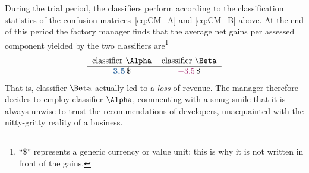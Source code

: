 \documentclass[\ifafour a4paper,12pt,\else a5paper,10pt,\fi%
onecolumn,oneside,article,%
british%
]{memoir}
\theoremstyle{remark}
\theoremstyle{innote}
\renewcommand*{\|}[1][]{\nonscript\:#1\vert\nonscript\:\mathopen{}}
\renewcommand*{\texteuro}{\$}
\newcommand*{\good}[1]{\ensuremath{{\color{mypurpleblue}\bm{#1}}}}
\newcommand*{\bad}[1]{\ensuremath{{\color{myredpurple}#1}}}
\begin{document}
During the trial period, the classifiers perform according to the classification statistics of the confusion matrices~\eqref{eq:CM_A} and \eqref{eq:CM_B} above. At the end of this period the factory manager finds that the average net gains per assessed component yielded by the two classifiers are\footnote{\enquote{\texteuro} represents a generic currency or value unit; this is why it is not written in front of the gains.}
\begin{equation}
  \label{eq:final_gains}
  \begin{tabular}{cc}
 classifier $\Alpha$ & classifier $\Beta$\\
    \hline
    \good{3.5}\,\text{\texteuro} & \bad{-3.5}\,\text{\texteuro}
 \end{tabular}
\end{equation}
That is, classifier $\Beta$ actually led to a \emph{loss} of revenue. The manager therefore decides to employ classifier $\Alpha$, commenting with a smug smile that it is always unwise to trust the recommendations of developers, unacquainted with the nitty-gritty reality of a business.

\smallskip
\end{document}
